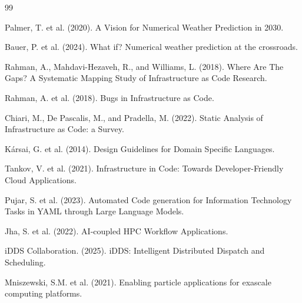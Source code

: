 \documentclass[11pt,twocolumn]{article}
\begin{document}

\begin{thebibliography}{99}

Palmer, T. et al. (2020).
\newblock A Vision for Numerical Weather Prediction in 2030.

Bauer, P. et al. (2024).
\newblock What if? Numerical weather prediction at the crossroads.

Rahman, A., Mahdavi-Hezaveh, R., and Williams, L. (2018).
\newblock Where Are The Gaps? A Systematic Mapping Study of Infrastructure as Code Research.

Rahman, A. et al. (2018).
\newblock Bugs in Infrastructure as Code.

Chiari, M., De Pascalis, M., and Pradella, M. (2022).
\newblock Static Analysis of Infrastructure as Code: a Survey.

K\'{a}rsai, G. et al. (2014).
\newblock Design Guidelines for Domain Specific Languages.

Tankov, V. et al. (2021).
\newblock Infrastructure in Code: Towards Developer-Friendly Cloud Applications.

Pujar, S. et al. (2023).
\newblock Automated Code generation for Information Technology Tasks in YAML through Large Language Models.

Jha, S. et al. (2022).
\newblock AI-coupled HPC Workflow Applications.

iDDS Collaboration. (2025).
\newblock iDDS: Intelligent Distributed Dispatch and Scheduling.

Mniszewski, S.M. et al. (2021).
\newblock Enabling particle applications for exascale computing platforms.


\end{thebibliography}
\end{document}
